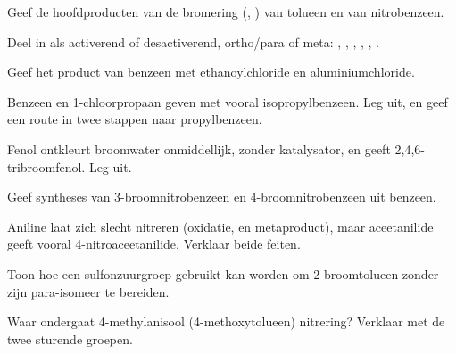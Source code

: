 \begin{exercise}[$\star$]\label{exo:b2:aromatic-substitution:2}
Geef de hoofdproducten van de bromering (, ) van tolueen en van
nitrobenzeen.
\end{exercise}

\begin{exercise}[$\star$]\label{exo:b2:aromatic-substitution:3}
Deel in als activerend of desactiverend, ortho/para of meta: , , ,
, , .
\end{exercise}

\begin{exercise}[$\star$]\label{exo:b2:aromatic-substitution:4}
Geef het product van benzeen met ethanoylchloride en aluminiumchloride.
\end{exercise}

\begin{exercise}[$\star\star$]\label{exo:b2:aromatic-substitution:5}
Benzeen en 1-chloorpropaan geven met  vooral isopropylbenzeen. Leg uit, en geef een
route in twee stappen naar propylbenzeen.
\end{exercise}

\begin{exercise}[$\star\star$]\label{exo:b2:aromatic-substitution:6}
Fenol ontkleurt broomwater onmiddellijk, zonder katalysator, en geeft
2,4,6-tribroomfenol. Leg uit.
\end{exercise}

\begin{exercise}[$\star\star$]\label{exo:b2:aromatic-substitution:7}
Geef syntheses van 3-broomnitrobenzeen en 4-broomnitrobenzeen uit benzeen.
\end{exercise}

\begin{exercise}[$\star\star$]\label{exo:b2:aromatic-substitution:8}
Aniline laat zich slecht nitreren (oxidatie, en metaproduct), maar aceetanilide geeft vooral
4-nitroaceetanilide. Verklaar beide feiten.
\end{exercise}

\begin{exercise}[$\star\star$]\label{exo:b2:aromatic-substitution:9}
Toon hoe een sulfonzuurgroep gebruikt kan worden om 2-broomtolueen zonder zijn para-isomeer te bereiden.
\end{exercise}

\begin{exercise}[$\star\star\star$]\label{exo:b2:aromatic-substitution:10}
Waar ondergaat 4-methylanisool (4-methoxytolueen) nitrering? Verklaar met de twee
sturende groepen.
\end{exercise}

